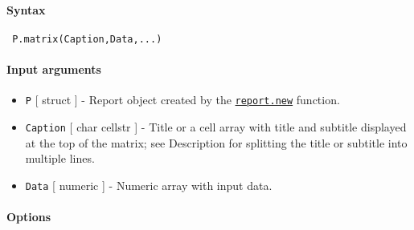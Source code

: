 


	\paragraph{Syntax}
 
 \begin{verbatim}
 P.matrix(Caption,Data,...)
 \end{verbatim}
 
 \paragraph{Input arguments}
 
 \begin{itemize}
 \item
   \texttt{P} {[} struct {]} - Report object created by the
   \href{report/new}{\texttt{report.new}} function.
 \item
   \texttt{Caption} {[} char \textbar{} cellstr {]} - Title or a cell
   array with title and subtitle displayed at the top of the matrix; see
   Description for splitting the title or subtitle into multiple lines.
 \item
   \texttt{Data} {[} numeric {]} - Numeric array with input data.
 \end{itemize}
 
 \paragraph{Options}
 
